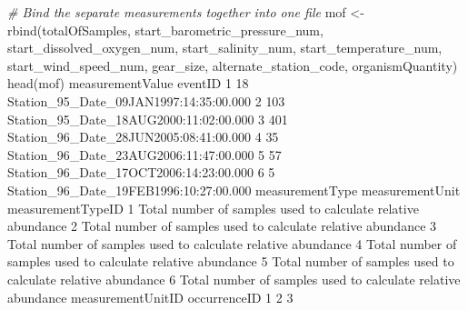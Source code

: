 \documentclass[
]{book}
\newenvironment{Shaded}{\begin{snugshade}}{\end{snugshade}}
\newcommand{\CommentTok}[1]{\textcolor[rgb]{0.56,0.35,0.01}{\textit{#1}}}
\newcommand{\DecValTok}[1]{\textcolor[rgb]{0.00,0.00,0.81}{#1}}
\newcommand{\FloatTok}[1]{\textcolor[rgb]{0.00,0.00,0.81}{#1}}
\newcommand{\FunctionTok}[1]{\textcolor[rgb]{0.00,0.00,0.00}{#1}}
\newcommand{\NormalTok}[1]{#1}
\newcommand{\OtherTok}[1]{\textcolor[rgb]{0.56,0.35,0.01}{#1}}
\newcommand{\SpecialCharTok}[1]{\textcolor[rgb]{0.00,0.00,0.00}{#1}}
\begin{document}
\begin{Shaded}
\begin{Highlighting}[]
\CommentTok{\# Bind the separate measurements together into one file  }
\NormalTok{mof }\OtherTok{\textless{}{-}} \FunctionTok{rbind}\NormalTok{(totalOfSamples, start\_barometric\_pressure\_num, start\_dissolved\_oxygen\_num, }
\NormalTok{             start\_salinity\_num, start\_temperature\_num, start\_wind\_speed\_num, gear\_size,}
\NormalTok{             alternate\_station\_code, organismQuantity)}
\FunctionTok{head}\NormalTok{(mof)}
\NormalTok{ measurementValue                                eventID}
\DecValTok{1}               \DecValTok{18}\NormalTok{ Station\_95\_Date\_09JAN1997}\SpecialCharTok{:}\DecValTok{14}\SpecialCharTok{:}\DecValTok{35}\SpecialCharTok{:}\FloatTok{00.000}
\DecValTok{2}              \DecValTok{103}\NormalTok{ Station\_95\_Date\_18AUG2000}\SpecialCharTok{:}\DecValTok{11}\SpecialCharTok{:}\DecValTok{02}\SpecialCharTok{:}\FloatTok{00.000}
\DecValTok{3}              \DecValTok{401}\NormalTok{ Station\_96\_Date\_28JUN2005}\SpecialCharTok{:}\DecValTok{08}\SpecialCharTok{:}\DecValTok{41}\SpecialCharTok{:}\FloatTok{00.000}
\DecValTok{4}               \DecValTok{35}\NormalTok{ Station\_96\_Date\_23AUG2006}\SpecialCharTok{:}\DecValTok{11}\SpecialCharTok{:}\DecValTok{47}\SpecialCharTok{:}\FloatTok{00.000}
\DecValTok{5}               \DecValTok{57}\NormalTok{ Station\_96\_Date\_17OCT2006}\SpecialCharTok{:}\DecValTok{14}\SpecialCharTok{:}\DecValTok{23}\SpecialCharTok{:}\FloatTok{00.000}
\DecValTok{6}                \DecValTok{5}\NormalTok{ Station\_96\_Date\_19FEB1996}\SpecialCharTok{:}\DecValTok{10}\SpecialCharTok{:}\DecValTok{27}\SpecialCharTok{:}\FloatTok{00.000}
\NormalTok{                                               measurementType measurementUnit measurementTypeID}
\DecValTok{1}\NormalTok{ Total number of samples used to calculate relative abundance                                  }
\DecValTok{2}\NormalTok{ Total number of samples used to calculate relative abundance                                  }
\DecValTok{3}\NormalTok{ Total number of samples used to calculate relative abundance                                  }
\DecValTok{4}\NormalTok{ Total number of samples used to calculate relative abundance                                  }
\DecValTok{5}\NormalTok{ Total number of samples used to calculate relative abundance                                  }
\DecValTok{6}\NormalTok{ Total number of samples used to calculate relative abundance                                  }
\NormalTok{  measurementUnitID occurrenceID}
\DecValTok{1}                               
\DecValTok{2}                               
\DecValTok{3}                               

\end{Highlighting}
\end{Shaded}
\end{document}
